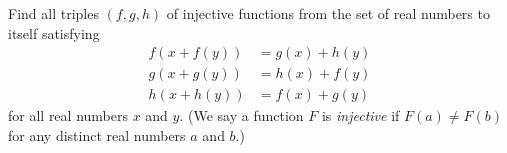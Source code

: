 Find all triples $(f,g,h)$ of injective functions from the set of real numbers to itself satisfying 
\begin{align*}
	f(x+f(y)) &= g(x) + h(y) \\
	g(x+g(y)) &= h(x) + f(y) \\
	h(x+h(y)) &= f(x) + g(y) 
\end{align*}
for all real numbers $x$ and $y$. (We say a function $F$ is \emph{injective} if $F(a)\neq F(b)$ for any distinct real numbers $a$ and $b$.)